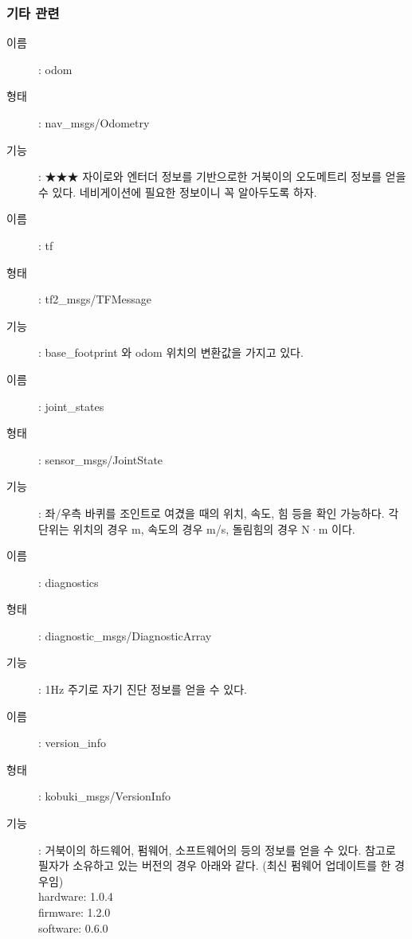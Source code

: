 \subsubsection{기타 관련}

\vspace{\baselineskip}
\begin{description}
\item[이름]: odom
\item[형태]: nav\_msgs/Odometry
\item[기능]: ★★★ 자이로와 엔터더 정보를 기반으로한 거북이의 오도메트리 정보를 얻을 수 있다. 네비게이션에 필요한 정보이니 꼭 알아두도록 하자.
\end{description}

\vspace{\baselineskip}
\begin{description}
\item[이름]: tf
\item[형태]: tf2\_msgs/TFMessage
\item[기능]: base\_footprint 와 odom 위치의 변환값을 가지고 있다.
\end{description}

\vspace{\baselineskip}
\begin{description}
\item[이름]: joint\_states
\item[형태]: sensor\_msgs/JointState
\item[기능]: 좌/우측 바퀴를 조인트로 여겼을 때의 위치, 속도, 힘 등을 확인 가능하다. 각 단위는 위치의 경우 m, 속도의 경우 m/s, 돌림힘의 경우 N·m 이다.
\end{description}

\vspace{\baselineskip}
\begin{description}
\item[이름]: diagnostics
\item[형태]: diagnostic\_msgs/DiagnosticArray
\item[기능]: 1Hz 주기로 자기 진단 정보를 얻을 수 있다.
\end{description}

\vspace{\baselineskip}
\begin{description}
\item[이름]: version\_info
\item[형태]: kobuki\_msgs/VersionInfo
\item[기능]: 거북이의 하드웨어, 펌웨어, 소프트웨어의 등의 정보를 얻을 수 있다. 참고로 필자가 소유하고 있는 버전의 경우 아래와 같다. (최신 펌웨어 업데이트를 한 경우임)\\
hardware: 1.0.4\\
firmware: 1.2.0\\
software: 0.6.0
\end{description}

